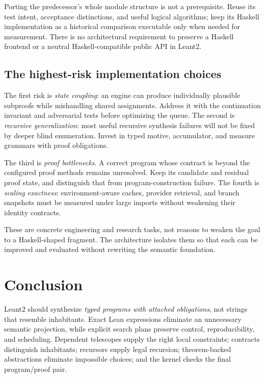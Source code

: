 Porting the predecessor's whole module structure is not a prerequisite. Reuse
its test intent, acceptance distinctions, and useful logical algorithms; keep
its Haskell implementation as a historical comparison executable only when
needed for measurement. There is no architectural requirement to preserve a
Haskell frontend or a neutral Haskell-compatible public API in Leant2.

\subsection{The highest-risk implementation choices}

The first risk is \emph{state coupling}: an engine can produce individually
plausible subproofs while mishandling shared assignments. Address it with the
continuation invariant and adversarial tests before optimizing the queue.
The second is \emph{recursive generalization}: most useful recursive synthesis
failures will not be fixed by deeper blind enumeration. Invest in typed
motive, accumulator, and measure grammars with proof obligations.

The third is \emph{proof bottlenecks}. A correct program whose contract is
beyond the configured proof methods remains unresolved. Keep its candidate
and residual proof state, and distinguish that from program-construction
failure. The fourth is \emph{scaling exactness}: environment-aware caches,
provider retrieval, and branch snapshots must be measured under large imports
without weakening their identity contracts.

These are concrete engineering and research tasks, not reasons to weaken the
goal to a Haskell-shaped fragment. The architecture isolates them so that each
can be improved and evaluated without rewriting the semantic foundation.

\section{Conclusion}

Leant2 should synthesize \emph{typed programs with attached obligations}, not
strings that resemble inhabitants. Exact Lean expressions eliminate an
unnecessary semantic projection, while explicit search plans preserve control,
reproducibility, and scheduling. Dependent telescopes supply the right local
constraints; contracts distinguish inhabitants; recursors supply legal
recursion; theorem-backed abstractions eliminate impossible choices; and the
kernel checks the final program/proof pair.

